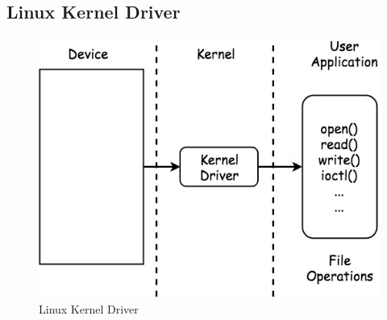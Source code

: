 \subsection{Linux Kernel Driver}
\label{subsec:Linux Kernel Driver} 
\begin{figure}[!htb]
  \centering
  \includegraphics[scale=0.5]{images/linux_kernel_driver.jpg}
  \caption[Linux Kernel Driver]{Linux Kernel Driver}
  \label{fig:UIO Driver}
\end{figure}


